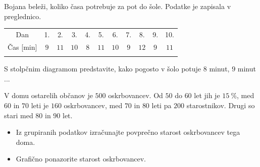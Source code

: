    
        \begin{naloga}
         
            Bojana beleži, koliko časa potrebuje za pot do šole. Podatke je zapisala v preglednico. 

             \begin{table}[H]
                 \centering
                 \begin{tabular}{||c|c|c|c|c|c|c|c|c|c|c||} 
                 \hhline{|t:===========:t|}
                 \rowcolor[rgb]{0.843,0.718,0.718} 
                 Dan  & 1. & 2. & 3. & 4. & 5. & 6. & 7. & 8. & 9. & 10.   \\ 
                 \hhline{|:===========:|}
                 Čas [min] & $9$ & $11$ & $10$ & $8$ & $11$ & $10$ & $9$ & $12$& $9$ & $11$ \\ 
                 \hhline{|b:===========:b|}
                 \end{tabular}
             \end{table}

             S stolpčnim diagramom predstavite, kako pogosto v šolo potuje $8$ minut, $9$ minut ... 

        \end{naloga}

        \begin{naloga}
         
            V domu ostarelih občanov je $500$ oskrbovancev. Od $50$ do $60$ let jih je $15~\%$, med $60$ in $70$ leti je $160$ oskrbovancev,
            med $70$ in $80$ leti pa $200$ starostnikov. Drugi so stari med $80$ in $90$ let.
            \begin{itemize}
                \item Iz grupiranih podatkov izračunajte povprečno starost oskrbovancev tega doma.
                \item Grafično ponazorite starost oskrbovancev.
            \end{itemize}
            
        \end{naloga}


 